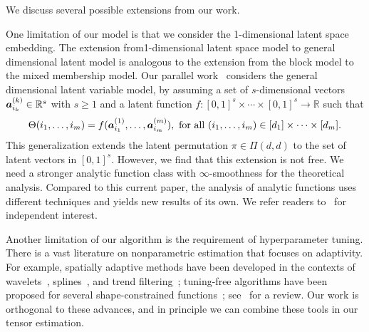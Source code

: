 \documentclass[12pt]{article}
\theoremstyle{definition}
\begin{document}
We discuss several possible extensions from our work.
{\color{blue}
One limitation of our model is that we consider the 1-dimensional latent space embedding. %
The extension from1-dimensional latent space model to general dimensional latent model is analogous to the extension from the block model to the mixed membership model. Our parallel work~\citep{lee2023statistical} considers the general dimensional latent variable model, by assuming  a set of $s$-dimensional vectors $\bm{a}^{(k)}_{i_k}\in\mathbb{R}^s$ with $s\geq 1$ and a latent function $f\colon[0,1]^{s}\times\cdots\times[0,1]^{s}\rightarrow \mathbb{R}$ such that
    \begin{align}\label{eq:LVM2}
    \Theta(i_1,\ldots,i_m) = f(\bm{a}^{(1)}_{i_1},\ldots,\bm{a}^{(m)}_{i_m}), \text{ for all } (i_1,\ldots,i_m)\in[d_1]\times\cdots\times [d_m].
\end{align}
This generalization extends the latent permutation $\pi\in\Pi(d,d)$ to the set of latent vectors in $[0,1]^s$. However, we find that this extension is not free. We need a stronger analytic function class with $\infty$-smoothness for the theoretical analysis. Compared to this current paper, the analysis of analytic functions uses different techniques and yields new results of its own. We refer readers to~\cite{lee2023statistical} for independent interest. 

Another limitation of our algorithm is the requirement of hyperparameter tuning. There is a vast literature on nonparametric estimation that focuses on adaptivity. For example, spatially adaptive methods have been developed in the contexts of wavelets~\citep{donoho1994ideal}, splines~\citep{mammen1997locally}, and trend filtering~\citep{tibshirani2014adaptive}; tuning-free algorithms have been proposed for several shape-constrained functions~\citep{chatterjee2019adaptive,feng2022nonparametric,bellec2018sharp}; see~\cite{cai2012minimax} for a review. Our work is orthogonal to these advances, and in principle we can combine these tools in our tensor estimation.} %
\end{document}
